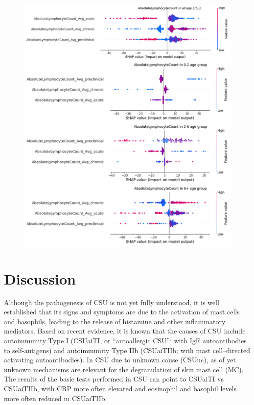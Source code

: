 \documentclass[final,3p,times,authoryear]{elsarticle}
\begin{document}
\begin{figure}[t]  
    \centering 
    \includegraphics[width=\textwidth]{figures/modelexplanation_age2.png}
    \caption{}\label{modelexplanation_age2}

\end{figure}

\section{Discussion}\label{Discussion}



Although the pathogenesis of CSU is not yet fully understood, it is well established that its signs and symptoms are due to the activation of mast cells and basophils, leading to the release of histamine and other inflammatory mediators\citep{Zuberbier2021The}. Based on recent evidence, it is known that the causes of CSU include autoimmunity Type I (CSUaiTI, or “autoallergic CSU”; with IgE autoantibodies to self-antigens) and autoimmunity Type IIb (CSUaiTIIb; with mast cell–directed activating autoantibodies). In CSU due to unknown cause (CSUuc), as of yet unknown mechanisms are relevant for the degranulation of skin mast cell (MC)\citep{sella2023type, Maronese2023IgG}. The results of the basic tests performed in CSU can point to CSUaiTI vs CSUaiTIIb, with CRP more often elevated and eosinophil and basophil levels more often reduced in CSUaiTIIb\citep{Xiang2023Chronic}.
\end{document}
